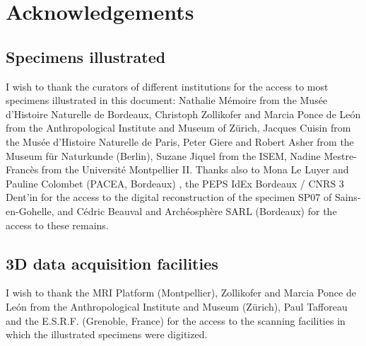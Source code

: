 
\chapter{Acknowledgements}
\minitoc 


\section{Specimens illustrated} 
I wish to thank the curators of different institutions for the access to most specimens illustrated
in this document: Nathalie Mémoire from the Musée d'Histoire Naturelle de Bordeaux, Christoph
Zollikofer and Marcia Ponce de León from the Anthropological Institute and Museum of Zürich,
Jacques Cuisin from the Musée d’Histoire Naturelle de Paris, Peter Giere and Robert Asher from the
Museum für Naturkunde (Berlin), Suzane Jiquel from the ISEM, Nadine Mestre-Francès from the
Université Montpellier II. Thanks also to Mona Le Luyer and Pauline Colombet (PACEA, Bordeaux) ,
the PEPS IdEx Bordeaux / CNRS 3 Dent'in for the access to the digital reconstruction of the specimen
SP07 of Sains-en-Gohelle, and Cédric Beauval and Archéosphère SARL (Bordeaux) for the access to
these remains.

\section{3D data acquisition facilities} 
I wish to thank the MRI Platform (Montpellier), Zollikofer and Marcia Ponce de León from the
Anthropological Institute and Museum (Zürich), Paul Tafforeau and the E.S.R.F. (Grenoble, France) for
the access to the scanning facilities in which the illustrated specimens were digitized.
